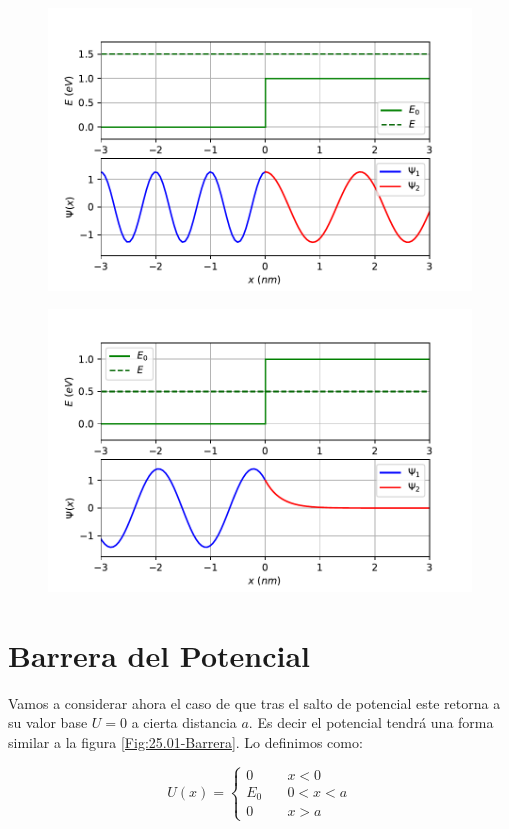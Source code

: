 \documentclass[12pt]{article}
\begin{document}
\begin{figure}[h!] \centering
\includegraphics[scale=0.7]{potencial-escalon2.pdf}
\end{figure}
\begin{figure}[h!] \centering
\includegraphics[scale=0.7]{potencial-escalon1.pdf}
\end{figure}

\section{Barrera del Potencial}

Vamos a considerar ahora el caso de que tras el salto de potencial  este retorna a su valor base $U=0$ a cierta distancia $a$. Es decir el potencial tendrá una forma similar a la  figura \ref{Fig:25.01-Barrera}. Lo definimos como:

\begin{equation}
U(x) = \left\lbrace \begin{array}{ll}
0 & \quad x<0 \\
E_0 & \quad 0 < x < a \\
0 & \quad x > a
\end{array} \right.
\end{equation}
\end{document}
